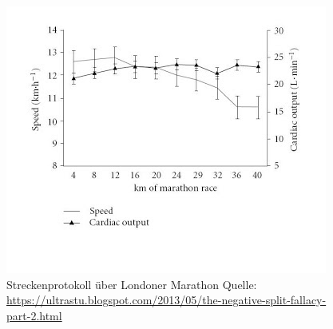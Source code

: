 \begin{figure}[H]
    \centering
    \includegraphics[width = .7\textwidth]{images/mrep.png}
    \caption{Streckenprotokoll über Londoner Marathon
        \newline
        Quelle: \url{https://ultrastu.blogspot.com/2013/05/the-negative-split-fallacy-part-2.html}
    }
    \label{fig:graph}
\end{figure}